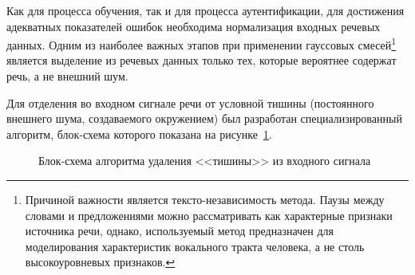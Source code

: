Как для процесса обучения, так и для процесса аутентификации, для достижения адекватных показателей ошибок необходима нормализация входных речевых данных. Одним из наиболее важных этапов при применении гауссовых смесей\footnote{Причиной важности является тексто-независимость метода. Паузы между словами и предложениями можно рассматривать как характерные признаки источника речи, однако, используемый метод предназначен для моделирования характеристик вокального тракта человека, а не столь высокоуровневых признаков.} является выделение из речевых данных только тех, которые вероятнее содержат речь, а не внешний шум.

Для отделения во входном сигнале речи от условной тишины (постоянного внешнего шума, создаваемого окружением) был разработан специализированный алгоритм, блок-схема которого показана на рисунке~\ref{fig:silence_remove_flowchart}.

\begin{figure}
    \caption{Блок-схема алгоритма удаления <<тишины>> из входного сигнала}
    \label{fig:silence_remove_flowchart}
\end{figure}

